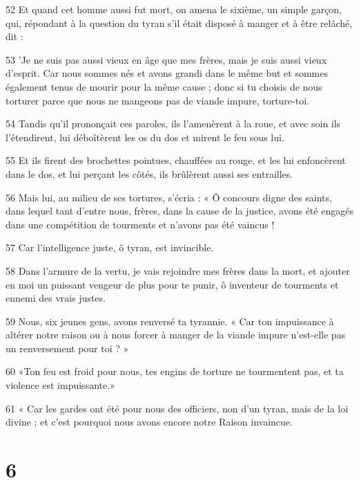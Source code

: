\par 52 Et quand cet homme aussi fut mort, on amena le sixième, un simple garçon, qui, répondant à la question du tyran s'il était disposé à manger et à être relâché, dit :

\par 53 'Je ne suis pas aussi vieux en âge que mes frères, mais je suis aussi vieux d'esprit. Car nous sommes nés et avons grandi dans le même but et sommes également tenus de mourir pour la même cause ; donc si tu choisis de nous torturer parce que nous ne mangeons pas de viande impure, torture-toi.

\par 54 Tandis qu'il prononçait ces paroles, ils l'amenèrent à la roue, et avec soin ils l'étendirent, lui déboîtèrent les os du dos et mirent le feu sous lui.

\par 55 Et ils firent des brochettes pointues, chauffées au rouge, et les lui enfoncèrent dans le dos, et lui perçant les côtés, ils brûlèrent aussi ses entrailles.

\par 56 Mais lui, au milieu de ses tortures, s'écria : « Ô concours digne des saints, dans lequel tant d'entre nous, frères, dans la cause de la justice, avons été engagés dans une compétition de tourments et n'avons pas été vaincus !

\par 57 Car l'intelligence juste, ô tyran, est invincible.

\par 58 Dans l'armure de la vertu, je vais rejoindre mes frères dans la mort, et ajouter en moi un puissant vengeur de plus pour te punir, ô inventeur de tourments et ennemi des vrais justes.

\par 59 Nous, six jeunes gens, avons renversé ta tyrannie. « Car ton impuissance à altérer notre raison ou à nous forcer à manger de la viande impure n'est-elle pas un renversement pour toi ? »

\par 60 «Ton feu est froid pour nous, tes engins de torture ne tourmentent pas, et ta violence est impuissante.»

\par 61 « Car les gardes ont été pour nous des officiers, non d'un tyran, mais de la loi divine ; et c'est pourquoi nous avons encore notre Raison invaincue.

\chapter{6}

